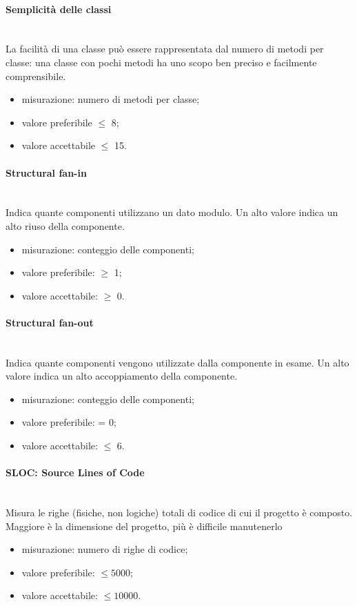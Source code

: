 			\paragraph{Semplicità delle classi}\mbox{}\\
			La facilità di una classe può essere rappresentata dal numero di metodi per classe: una classe con pochi metodi ha uno scopo ben preciso e facilmente comprensibile.
			\begin{itemize}
			\item misurazione: numero di metodi per classe;
			\item valore preferibile $\leq$ 8;
			\item valore accettabile $\leq$ 15.
			\end{itemize}
			\paragraph{Structural fan-in}\mbox{}\\ 
			Indica quante componenti utilizzano un dato modulo. Un alto	valore indica un alto riuso della componente.
			\begin{itemize}
				\item misurazione: conteggio delle componenti;
				\item valore preferibile: $\geq$ 1;
				\item valore accettabile: $\geq$ 0.
			\end{itemize}
			\paragraph{Structural fan-out}\mbox{}\\
			 Indica quante componenti vengono utilizzate dalla componente in esame. Un alto valore indica un alto accoppiamento della componente.
			\begin{itemize}
				\item misurazione: conteggio delle componenti;
				\item valore preferibile: = 0;
				\item valore accettabile: $\leq$ 6.
			\end{itemize}
			\paragraph{SLOC: Source Lines of Code}\mbox{}\\
			Misura le righe (fisiche, non logiche) totali di codice di cui il progetto è composto. Maggiore è la dimensione del progetto, più è difficile manutenerlo
			\begin{itemize}
				\item misurazione: numero di righe di codice;
				\item valore preferibile: $\leq5000$;
				\item valore accettabile: $\leq10000$.
			\end{itemize}
		
